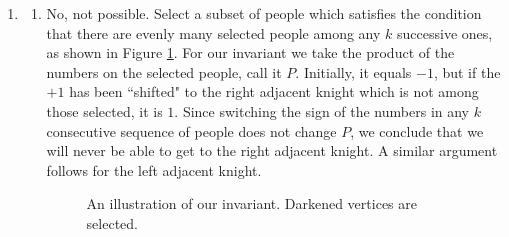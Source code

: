 \documentclass{article}
\newcommand\Clr{black}
\begin{document}
\begin{enumerate}
        \vspace{1mm}
        \textbf{Remark.} Note that our explanation can be generalized. The number of ways to choose $k$ non-consecutive objects from $n$ consecutive terms is $\binom{n - k + 1}{k}$.
        \item 
        \begin{enumerate}[label = \roman*.]
            \item No, not possible. Select a subset of people which satisfies the condition that there are evenly many selected people among any $k$ successive ones, as shown in Figure \ref{fig:1}. For our invariant we take the product of the numbers on the selected people, call it $P$. Initially, it equals $-1$, but if the $+1$ has been ``shifted" to the right adjacent knight which is not among those selected, it is $1$. Since switching the sign of the numbers in any $k$ consecutive sequence of people does not change $P$, we conclude that we will never be able to get to the right adjacent knight. A similar argument follows for the left adjacent knight.
            \begin{figure}[htbp]
            \centering
            \caption{An illustration of our invariant. Darkened vertices are selected.}
            \label{fig:1}
            \end{figure}
            

\end{enumerate}
\end{enumerate}
\end{document}
